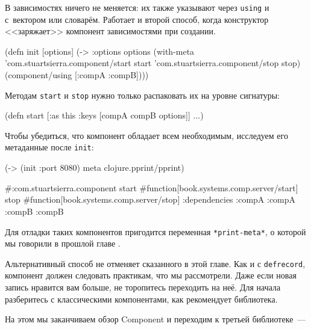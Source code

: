 В зависимостях ничего не меняется: их также указывают через \verb|using| и с~вектором
или словарём. Работает и второй способ, когда конструктор <<заряжает>>
компонент зависимостями при создании.

\begin{english}
  \begin{clojure}
(defn init [options]
  (-> {:options options}
      (with-meta
        {'com.stuartsierra.component/start start
         'com.stuartsierra.component/stop stop})
      (component/using [:compA :compB])))
  \end{clojure}
\end{english}

\noindent
Методам \verb|start| и \verb|stop| нужно только распаковать их на уровне
сигнатуры:

\begin{english}
  \begin{clojure}
(defn start
  [{:as this :keys [compA compB options]}]
  ...)
  \end{clojure}
\end{english}

Чтобы убедиться, что компонент обладает всем необходимым, исследуем его
метаданные после \verb|init|:

\begin{english}
  \begin{clojure}
(-> (init {:port 8080})
    meta
    clojure.pprint/pprint)

#:com.stuartsierra.component
  {start #function[book.systems.comp.server/start]
   stop #function[book.systems.comp.server/stop]
   :dependencies {:compA :compA :compB :compB}}
  \end{clojure}
\end{english}


\noindent
Для отладки таких компонентов пригодится переменная \verb|*print-meta*|, о
которой мы говорили в прошлой главе .

Альтернативный способ не отменяет сказанного в этой главе. Как и с
\verb|defrecord|, компонент должен следовать практикам, что мы рассмотрели. Даже
если новая запись нравится вам больше, не торопитесь переходить на неё. Для
начала разберитесь с классическими компонентами, как рекомендует библиотека.

На этом мы заканчиваем обзор Component и переходим к третьей библиотеке~---

